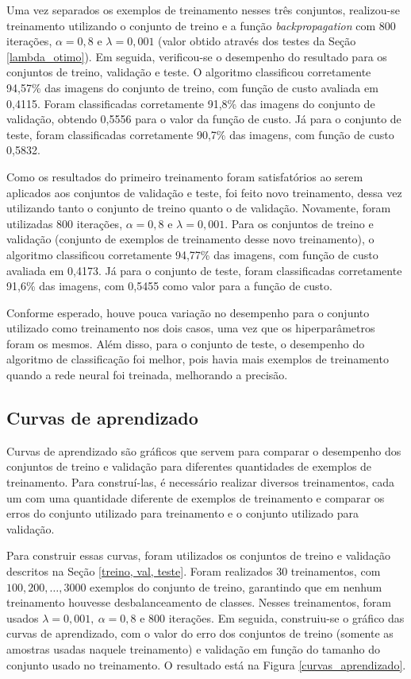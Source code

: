 \documentclass[12pt]{article}
\begin{document}
Uma vez separados os exemplos de treinamento nesses três conjuntos, realizou-se treinamento utilizando o conjunto de treino e a função \textit{backpropagation} com 800 iterações, $\alpha = 0,8$ e $\lambda=0,001$ (valor obtido através dos testes da Seção \ref{lambda_otimo}). Em seguida, verificou-se o desempenho do resultado para os conjuntos de treino, validação e teste. O algoritmo classificou corretamente 94,57\% das imagens do conjunto de treino, com função de custo avaliada em 0,4115. Foram classificadas corretamente 91,8\% das imagens do conjunto de validação, obtendo 0,5556 para o valor da função de custo. Já para o conjunto de teste, foram classificadas corretamente 90,7\% das imagens, com função de custo 0,5832.

Como os resultados do primeiro treinamento foram satisfatórios ao serem aplicados aos conjuntos de validação e teste, foi feito novo treinamento, dessa vez utilizando tanto o conjunto de treino quanto o de validação. Novamente, foram utilizadas 800 iterações, $\alpha = 0,8$ e $\lambda=0,001$. Para os conjuntos de treino e validação (conjunto de exemplos de treinamento desse novo treinamento), o algoritmo classificou corretamente 94,77\% das imagens, com função de custo avaliada em 0,4173. Já para o conjunto de teste, foram classificadas corretamente 91,6\% das imagens, com 0,5455 como valor para a função de custo.

Conforme esperado, houve pouca variação no desempenho para o conjunto utilizado como treinamento nos dois casos, uma vez que os hiperparâmetros foram os mesmos. Além disso, para o conjunto de teste, o desempenho do algoritmo de classificação foi melhor, pois havia mais exemplos de treinamento quando a rede neural foi treinada, melhorando a precisão.

\subsection{Curvas de aprendizado}
Curvas de aprendizado são gráficos que servem para comparar o desempenho dos conjuntos de treino e validação para diferentes quantidades de exemplos de treinamento. Para construí-las, é necessário realizar diversos treinamentos, cada um com uma quantidade diferente de exemplos de treinamento e comparar os erros do conjunto utilizado para treinamento e o conjunto utilizado para validação.

Para construir essas curvas, foram utilizados os conjuntos de treino e validação descritos na Seção \ref{treino, val, teste}. Foram realizados 30 treinamentos, com $100, 200, \ldots, 3000$ exemplos do conjunto de treino, garantindo que em nenhum treinamento houvesse desbalanceamento de classes. Nesses treinamentos, foram usados $\lambda=0,001, \ \alpha=0,8$ e 800 iterações. Em seguida, construiu-se o gráfico das curvas de aprendizado, com o valor do erro dos conjuntos de treino (somente as amostras usadas naquele treinamento) e validação em função do tamanho do conjunto usado no treinamento. O resultado está na Figura \ref{curvas_aprendizado}.
\end{document}
